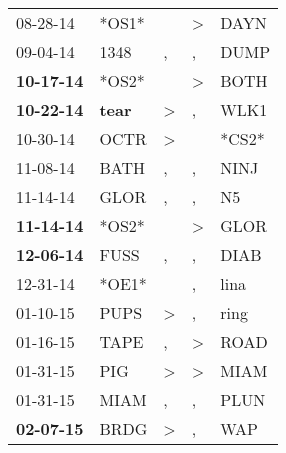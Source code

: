 \begin{supertabular}{p{0.07\textwidth}p{0.06\textwidth}p{0.02\textwidth}p{0.02\textwidth}p{0.06\textwidth}}
          08-28-14\textsuperscript{} &                            *OS1* &                  &  \textgreater &  DAYN\textsuperscript{} \\
          09-04-14\textsuperscript{} &           1348\textsuperscript{} &                , &             , &  DUMP\textsuperscript{} \\
 \textbf{10-17-14\textsuperscript{}} &                            *OS2* &                  &  \textgreater &  BOTH\textsuperscript{} \\
 \textbf{10-22-14\textsuperscript{}} &  \textbf{tear\textsuperscript{}} &     \textgreater &             , &  WLK1\textsuperscript{} \\
          10-30-14\textsuperscript{} &           OCTR\textsuperscript{} &     \textgreater &               &                   *CS2* \\
          11-08-14\textsuperscript{} &           BATH\textsuperscript{} &                , &             , &  NINJ\textsuperscript{} \\
          11-14-14\textsuperscript{} &           GLOR\textsuperscript{} &                , &             , &    N5\textsuperscript{} \\
 \textbf{11-14-14\textsuperscript{}} &                            *OS2* &                  &  \textgreater &  GLOR\textsuperscript{} \\
 \textbf{12-06-14\textsuperscript{}} &           FUSS\textsuperscript{} &                , &             , &  DIAB\textsuperscript{} \\
          12-31-14\textsuperscript{} &                            *OE1* &                  &             , &  lina\textsuperscript{} \\
          01-10-15\textsuperscript{} &           PUPS\textsuperscript{} &     \textgreater &             , &  ring\textsuperscript{} \\
          01-16-15\textsuperscript{} &           TAPE\textsuperscript{} &                , &  \textgreater &  ROAD\textsuperscript{} \\
          01-31-15\textsuperscript{} &            PIG\textsuperscript{} &     \textgreater &  \textgreater &  MIAM\textsuperscript{} \\
          01-31-15\textsuperscript{} &           MIAM\textsuperscript{} &                , &             , &  PLUN\textsuperscript{} \\
 \textbf{02-07-15\textsuperscript{}} &           BRDG\textsuperscript{} &     \textgreater &             , &   WAP\textsuperscript{} \\

\end{supertabular}
